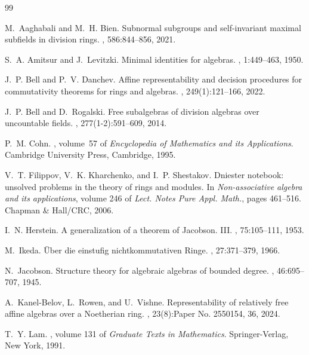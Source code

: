 \documentclass[11pt]{article}
\theoremstyle{definition}
\begin{document}
\begin{thebibliography}{99}

M.~Aaghabali and M.~H. Bien.
\newblock Subnormal subgroups and self-invariant maximal subfields in division
  rings.
, 586:844--856, 2021.

S.~A. Amitsur and J.~Levitzki.
\newblock Minimal identities for algebras.
, 1:449--463, 1950.

J.~P. Bell and P.~V. Danchev.
\newblock Affine representability and decision procedures for commutativity
  theorems for rings and algebras.
, 249(1):121--166, 2022.

J.~P. Bell and D.~Rogalski.
\newblock Free subalgebras of division algebras over uncountable fields.
, 277(1-2):591--609, 2014.

P.~M. Cohn.
, volume~57 of
  {\em Encyclopedia of Mathematics and its Applications}.
\newblock Cambridge University Press, Cambridge, 1995.

V.~T. Filippov, V.~K. Kharchenko, and I.~P. Shestakov.
\newblock Dniester notebook: unsolved problems in the theory of rings and
  modules.
\newblock In {\em Non-associative algebra and its applications}, volume 246 of
  {\em Lect. Notes Pure Appl. Math.}, pages 461--516. Chapman \& Hall/CRC,
  2006.

I.~N. Herstein.
\newblock A generalization of a theorem of {J}acobson. {III}.
, 75:105--111, 1953.

M.~Ikeda.
\newblock \"{U}ber die einstufig nichtkommutativen {R}inge.
, 27:371--379, 1966.

N.~Jacobson.
\newblock Structure theory for algebraic algebras of bounded degree.
, 46:695--707, 1945.

A.~Kanel-Belov, L.~Rowen, and U.~Vishne.
\newblock Representability of relatively free affine algebras over a
  {N}oetherian ring.
, 23(8):Paper No. 2550154, 36, 2024.

T.~Y. Lam.
, volume 131 of {\em
  Graduate Texts in Mathematics}.
\newblock Springer-Verlag, New York, 1991.


\end{thebibliography}
\end{document}
